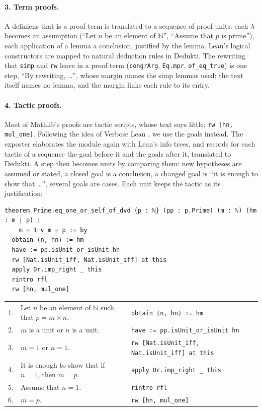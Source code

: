 \documentclass{easychair}
\newcommand{\ttt}[1]{\texttt{#1}}
\begin{document}
\paragraph{3. Term proofs.} A definiens that is a proof term is translated to a sequence of
proof units: each $\lambda$ becomes an assumption (``Let $n$ be an element of $\mathbb{N}$'',
``Assume that $p$ is prime''), each application of a lemma a conclusion, justified by the lemma.
Lean's logical constructors are mapped to natural deduction rules in Dedukti. The rewriting that
\ttt{simp} and \ttt{rw} leave in a proof term (\ttt{congrArg}, \ttt{Eq.mpr}, \ttt{of\_eq\_true})
is one step, ``By rewriting, \ldots'', whose margin names the simp lemmas used; the text itself
names no lemma, and the margin links each rule to its entry.

\paragraph{4. Tactic proofs.} Most of Mathlib's proofs are tactic scripts, whose text says
little: \ttt{rw [hn, mul\_one]}. Following the idea of Verbose Lean \cite{massot-2024}, we use
the goals instead. The exporter elaborates the module again with Lean's info trees, and records
for each tactic of a sequence the goal before it and the goals after it, translated to Dedukti.
A step then becomes units by comparing them: new hypotheses are assumed or stated, a closed
goal is a conclusion, a changed goal is ``it is enough to show that \ldots'', several goals are
cases. Each unit keeps the tactic as its justification:
\begin{lstlisting}
theorem Prime.eq_one_or_self_of_dvd {p : ℕ} (pp : p.Prime) (m : ℕ) (hm : m ∣ p) :
    m = 1 ∨ m = p := by
  obtain ⟨n, hn⟩ := hm
  have := pp.isUnit_or_isUnit hn
  rw [Nat.isUnit_iff, Nat.isUnit_iff] at this
  apply Or.imp_right _ this
  rintro rfl
  rw [hn, mul_one]
\end{lstlisting}
\begin{center}\footnotesize
\begin{tabular}{rll}
1. & Let $n$ be an element of $\mathbb{N}$ such that $p = m \times n$. & \ttt{obtain ⟨n, hn⟩ := hm}\\
2. & $m$ is a unit or $n$ is a unit. & \ttt{have := pp.isUnit\_or\_isUnit hn}\\
3. & $m = 1$ or $n = 1$. & \ttt{rw [Nat.isUnit\_iff, Nat.isUnit\_iff] at this}\\
4. & It is enough to show that if $n = 1$, then $m = p$. & \ttt{apply Or.imp\_right \_ this}\\
5. & Assume that $n = 1$. & \ttt{rintro rfl}\\
6. & $m = p$. & \ttt{rw [hn, mul\_one]}
\end{tabular}
\end{center}
\end{document}

